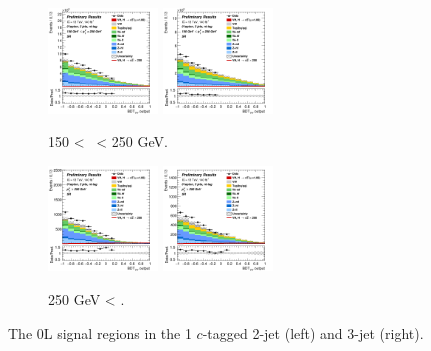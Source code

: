 \begin{figure}[h!]
    \centering
    \begin{subfigure}[b]{\textwidth}
        \centering
        \includegraphics[width=0.32\textwidth]{Images/VH/Own_fit/prefit_VHcc/Region_distmva_BMax250_BMin150_DSR_J2_TTypent_T1_L0_Y6051_Prefit.png}
        \includegraphics[width=0.32\textwidth]{Images/VH/Own_fit/prefit_VHcc/Region_distmva_BMax250_BMin150_DSR_J3_TTypent_T1_L0_Y6051_Prefit.png}
        \caption{150 < \ptv\ < 250 GeV.}
        \label{fig:plots_VHcc_OL_150_SR_1c}
    \end{subfigure}
    \begin{subfigure}[b]{\textwidth}
        \centering
        \includegraphics[width=0.32\textwidth]{Images/VH/Own_fit/prefit_VHcc/Region_distmva_BMin250_DSR_J2_TTypent_T1_L0_Y6051_Prefit.png}
        \includegraphics[width=0.32\textwidth]{Images/VH/Own_fit/prefit_VHcc/Region_distmva_BMin250_DSR_J3_TTypent_T1_L0_Y6051_Prefit.png}
        \caption{250 GeV < \ptv.}
        \label{fig:plots_VHcc_OL_250_SR_1c}
    \end{subfigure}
    \caption{The 0L signal regions in the 1 $c$-tagged 2-jet (left) and 3-jet (right).}
    \label{fig:plots_VHcc_OL_SR_1c}
\end{figure} 

